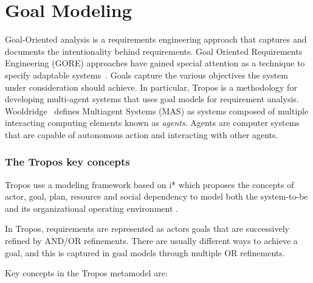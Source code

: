 \section{Goal Modeling}

Goal-Oriented analysis is a requirements engineering approach that captures and documents the intentionality behind requirements. Goal Oriented Requirements Engineering (GORE) approaches have gained special attention as a technique to specify adaptable systems~\cite{morandini_goal-oriented_2009}. Goals capture the various objectives the system under consideration should achieve. In particular, Tropos\cite{bresciani_tropos:_2004} is a methodology for developing multi-agent systems that uses goal models for requirement analysis.
Wooldridge~\cite{woolridge_introduction_2001} defines Multiagent Systems (MAS) as systems composed of multiple interacting computing elements known as \emph{agents}.
Agents are computer systems that are capable of autonomous action and interacting with other agents.

\subsubsection{The Tropos key concepts}

Tropos use a modeling framework based on i* \cite{yu_modelling_1996} which proposes the concepts of actor, goal, plan, resource and social dependency to model both the system-to-be and its organizational operating environment \cite{bresciani_tropos:_2004} \cite{morandini_tropos_2014}.

In Tropos, requirements are represented as actors goals that are successively refined by AND/OR refinements. There are usually different ways to achieve a goal, and this is captured in goal models through multiple OR refinements.

Key concepts in the Tropos metamodel are:

